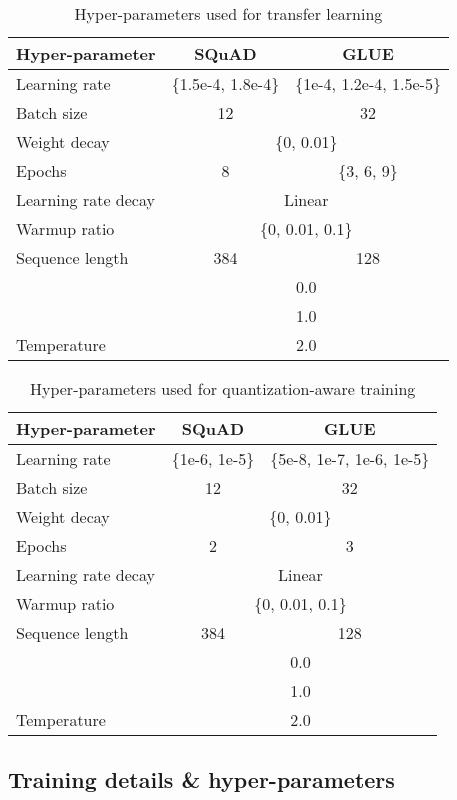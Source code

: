 \documentclass{article}
\begin{document}
\begin{table}[t]
\centering
\caption{Hyper-parameters used for transfer learning}
\label{tab:hyper-transfer}
\begin{tabular}{@{}lcc@{}}
\toprule
Hyper-parameter & SQuAD & GLUE \\ \midrule
Learning rate & \{1.5e-4, 1.8e-4\} & \{1e-4, 1.2e-4, 1.5e-5\} \\
Batch size & 12 & 32 \\
Weight decay & \multicolumn{2}{c}{\{0, 0.01\}} \\
Epochs & 8 & \{3, 6, 9\} \\
Learning rate decay & \multicolumn{2}{c}{Linear} \\
Warmup ratio & \multicolumn{2}{c}{\{0, 0.01, 0.1\}} \\
Sequence length & 384 & 128 \\
 & \multicolumn{2}{c}{0.0} \\
 & \multicolumn{2}{c}{1.0} \\
Temperature & \multicolumn{2}{c}{2.0} \\ \bottomrule
\end{tabular}\end{table}

\begin{table}[t]
\centering
\caption{Hyper-parameters used for quantization-aware training}
\label{tab:hyper-quant}
\begin{tabular}{@{}lcc@{}}
\toprule
Hyper-parameter & SQuAD & GLUE \\ \midrule
Learning rate & \{1e-6, 1e-5\} & \{5e-8, 1e-7, 1e-6, 1e-5\} \\
Batch size & 12 & 32 \\
Weight decay & \multicolumn{2}{c}{\{0, 0.01\}} \\
Epochs & 2 & 3 \\
Learning rate decay & \multicolumn{2}{c}{Linear} \\
Warmup ratio & \multicolumn{2}{c}{\{0, 0.01, 0.1\}} \\
Sequence length & 384 & 128 \\
 & \multicolumn{2}{c}{0.0} \\
 & \multicolumn{2}{c}{1.0} \\
Temperature & \multicolumn{2}{c}{2.0} \\ \bottomrule
\end{tabular}\end{table}

\subsection{Training details \& hyper-parameters}
\label{app:hyper-params}
\end{document}
